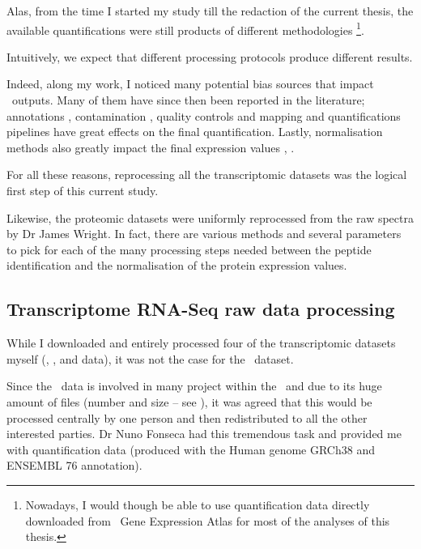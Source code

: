 Alas, from the time I started my study till the redaction of the current thesis,
the available quantifications were still products of different methodologies%
\footnote{Nowadays, I would though be able to use
quantification data directly downloaded from \EBI\ Gene Expression Atlas for
most of the analyses of this thesis.}.

Intuitively, we expect that different processing protocols produce
different results.

Indeed, along my work, I noticed many potential bias sources that impact
\Rnaseq\ outputs. Many of them have since then been reported in the literature;
annotations \citep{annotationDiff},
contamination \citep{contaminationRNAseq},
quality controls \citep{qualityRNAseq} and
mapping and quantifications pipelines \citep{Fonseca2014}
have great effects on the final quantification. Lastly, normalisation
methods also greatly impact the final expression values
\citep{Dillies2013}, \citep{normalisation2}.

For all these reasons, reprocessing all the transcriptomic datasets was the
logical first step of this current study.

Likewise, the proteomic datasets were uniformly reprocessed from the raw spectra
by Dr James Wright. In fact, there are various methods and several parameters
to pick for each of the many processing steps needed between the peptide
identification and the normalisation of the protein expression values.


\subsection{Transcriptome RNA-Seq raw data processing}

While I downloaded and entirely processed four of the transcriptomic datasets
myself (, ,  and 
data), it was not the case for the \Gtex\ dataset.

Since the \Gtex\ data is involved in many project within the \EBI\
and due to its huge amount of files (number and  size -- see ),
it was agreed that this would be processed centrally by one person and then
redistributed to all the other interested parties. Dr Nuno Fonseca had this
tremendous task and provided me with quantification data (produced with the
Human genome GRCh38 and ENSEMBL 76 annotation).

